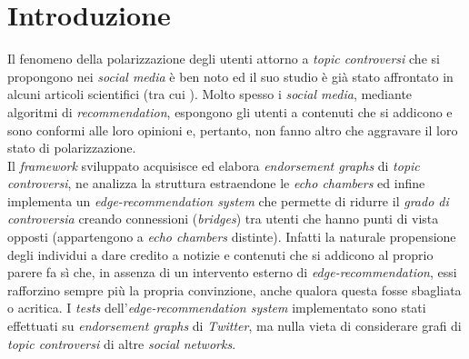 \chapter{Introduzione}
\label{chap:introduzione}

Il fenomeno della polarizzazione degli utenti attorno a \textit{topic controversi} che si propongono nei \textit{social media} è ben noto ed il suo studio è già stato affrontato in alcuni articoli scientifici (tra cui \cite{musco:paper}\cite{morales:paper}). Molto spesso i \textit{social media}, mediante algoritmi di \textit{recommendation}, espongono gli utenti a contenuti che si addicono e sono conformi alle loro opinioni e, pertanto, non fanno altro che aggravare il loro stato di polarizzazione. \\Il \textit{framework} sviluppato acquisisce ed elabora \textit{endorsement graphs} di \textit{topic controversi}, ne analizza la struttura estraendone le \textit{echo chambers} ed infine implementa un \textit{edge-recommendation system} che permette di ridurre il \textit{grado di controversia} creando connessioni (\textit{bridges}) tra utenti che hanno punti di vista opposti (appartengono a \textit{echo chambers} distinte). Infatti la naturale propensione degli individui a dare credito a notizie e contenuti che si addicono al proprio parere fa sì che, in assenza di un intervento esterno di \textit{edge-recommendation}, essi rafforzino sempre più la propria convinzione, anche qualora questa fosse sbagliata o acritica. I \textit{tests} dell'\textit{edge-recommendation system} implementato sono stati effettuati su \textit{endorsement graphs} di \textit{Twitter}, ma nulla vieta di considerare grafi di \textit{topic controversi} di altre \textit{social networks}. 
